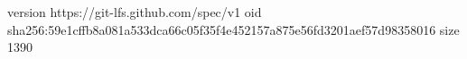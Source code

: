 version https://git-lfs.github.com/spec/v1
oid sha256:59e1cffb8a081a533dca66c05f35f4e452157a875e56fd3201aef57d98358016
size 1390
